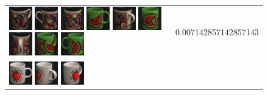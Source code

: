 \begin{figure}[tbp]
\begin{center}
\begin{tabular}{m{11cm} | m{3cm} |}
\includegraphics[width=1cm]{coil/beeld-63.eps}
\includegraphics[width=1cm]{coil/beeld-61.eps}
\includegraphics[width=1cm]{coil/beeld-62.eps}
\includegraphics[width=1cm]{coil/beeld-30.eps}
\includegraphics[width=1cm]{coil/beeld-64.eps}
\includegraphics[width=1cm]{coil/beeld-32.eps}
\includegraphics[width=1cm]{coil/beeld-65.eps}
\includegraphics[width=1cm]{coil/beeld-33.eps}
\includegraphics[width=1cm]{coil/beeld-31.eps}
& {\scriptsize 0.007142857142857143}
\\
\includegraphics[width=1cm]{coil/beeld-36.eps}
\includegraphics[width=1cm]{coil/beeld-40.eps}
\includegraphics[width=1cm]{coil/beeld-39.eps}

\end{tabular}
\end{center}
\end{figure}
